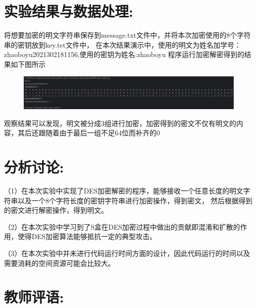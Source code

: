 \documentclass[a4paper,11pt,UTF8]{ctexart}
\newcommand{\bottomcaption}{%
\setlength{\abovecaptionskip}{6pt}%
\setlength{\belowcaptionskip}{6pt}%
\caption}
\newcommand{\xiaowuhao}{\fontsize{9pt}{\baselineskip}\selectfont}   %
\begin{document}
\section{实验结果与数据处理:}
        将想要加密的明文字符串保存到message.txt文件中，并将本次加密使用的8个字符串的密钥放到key.tet文件中，
        在本次结果演示中，使用的明文为姓名加学号：zhaoboyu2021302181156,使用的密钥为姓名:zhaoboyu
        程序运行加密解密得到的结果如下图所示
        \begin{figure}[H]
            \centering
            \includegraphics[width=15cm]{result.png}
            \bottomcaption{\xiaowuhao{程序运行结果}}
        \end{figure}
        观察结果可以发现，明文被分成3组进行加密，加密得到的密文不仅有明文的内容，其后还跟随着由于最后一组不足64位而补齐的0

\section{分析讨论:}
    （1）在本次实验中实现了DES加密解密的程序，能够接收一个任意长度的明文字符串以及一个8个字符长度的密钥字符串进行加密操作，得到密文，
    然后根据得到的密文进行解密操作，得到明文。\par
    （2）在本次实验中学习到了S盒在DES加密过程中做出的贡献即混淆和扩散的作用，使得DES加密算法能够抵抗一定的典型攻击。\par
    （3）在本次实验中并未进行代码运行时间方面的设计，因此代码运行的时间以及需要消耗的空间资源可能会比较大。   

    
\section{教师评语:}
\end{document}
